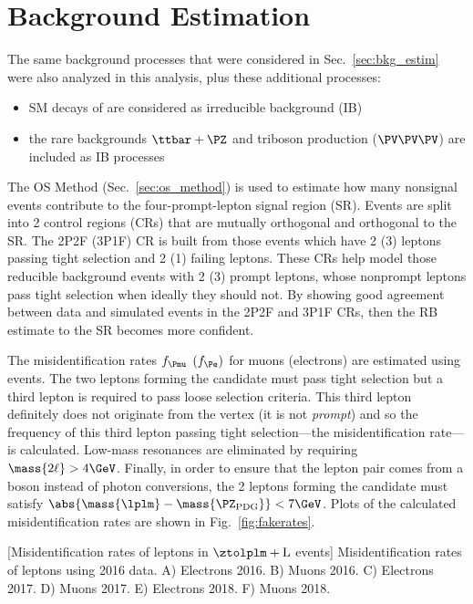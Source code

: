 \section{Background Estimation}
\label{sec:bkg_estim_dilep}
The same background processes that were considered in Sec.~\ref{sec:bkg_estim} were also analyzed in this analysis, plus these additional processes:
\begin{itemize}
    \item SM decays of \htofourl are considered as irreducible background (IB)
    \item the rare backgrounds $\ttbar + \PZ$ and triboson production ($\PV\PV\PV$) are included as IB processes
\end{itemize}

The OS Method (Sec.~\ref{sec:os_method}) is used to estimate how many nonsignal events contribute to the four-prompt-lepton signal region (SR).
Events are split into 2 control regions (CRs) that are mutually orthogonal and orthogonal to the SR.
The 2P2F (3P1F) CR is built from those events which have 2 (3) leptons passing tight selection and 2 (1) failing leptons.
These CRs help model those reducible background events with 2 (3) prompt leptons, whose nonprompt leptons pass tight selection when ideally they should not.
By showing good agreement between data and simulated events in the 2P2F and 3P1F CRs, then the RB estimate to the SR becomes more confident.

The misidentification rates $f_{\Pmu}$ $(f_{\Pe})$ for muons (electrons) are estimated using \ztolplm events.
The two leptons forming the \PZ candidate must pass tight selection but a third lepton is required to pass loose selection criteria.
This third lepton definitely does not originate from the \PZ vertex (\ie it is not \emph{prompt}) and so the frequency of this third lepton passing tight selection---the misidentification rate---is calculated.
Low-mass resonances are eliminated by requiring $\mass{2\ell} > 4\GeV$.
Finally, in order to ensure that the lepton pair comes from a \PZ boson instead of photon conversions, the 2 leptons forming the \PZ candidate must satisfy $\abs{\mass{\lplm} - \mass{\PZ_{\text{PDG}}}} < 7\GeV$.
Plots of the calculated misidentification rates are shown in Fig.~\ref{fig:fakerates}.
\begin{multiFigure}
    \centering
        [Misidentification rates of leptons in $\ztolplm + \text{L}$ events]
        {Misidentification rates of leptons using 2016 data.  %
        \;A) Electrons 2016.
        \;B) Muons 2016.
        \;C) Electrons 2017.
        \;D) Muons 2017.
        \;E) Electrons 2018.
        \;F) Muons 2018.}
    \label{fig:fakerates}
\end{multiFigure}